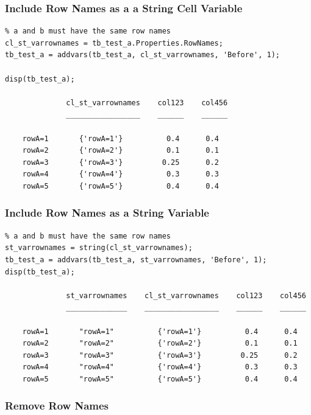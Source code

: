 \documentclass[
]{book}
\begin{document}
\hypertarget{include-row-names-as-a-a-string-cell-variable}{%
\subsubsection{Include Row Names as a a String Cell Variable}\label{include-row-names-as-a-a-string-cell-variable}}

\begin{verbatim}
% a and b must have the same row names
cl_st_varrownames = tb_test_a.Properties.RowNames;
tb_test_a = addvars(tb_test_a, cl_st_varrownames, 'Before', 1);

disp(tb_test_a);

              cl_st_varrownames    col123    col456
              _________________    ______    ______

    rowA=1       {'rowA=1'}          0.4      0.4  
    rowA=2       {'rowA=2'}          0.1      0.1  
    rowA=3       {'rowA=3'}         0.25      0.2  
    rowA=4       {'rowA=4'}          0.3      0.3  
    rowA=5       {'rowA=5'}          0.4      0.4  
\end{verbatim}

\hypertarget{include-row-names-as-a-string-variable}{%
\subsubsection{Include Row Names as a String Variable}\label{include-row-names-as-a-string-variable}}

\begin{verbatim}
% a and b must have the same row names
st_varrownames = string(cl_st_varrownames);
tb_test_a = addvars(tb_test_a, st_varrownames, 'Before', 1);
disp(tb_test_a);

              st_varrownames    cl_st_varrownames    col123    col456
              ______________    _________________    ______    ______

    rowA=1       "rowA=1"          {'rowA=1'}          0.4      0.4  
    rowA=2       "rowA=2"          {'rowA=2'}          0.1      0.1  
    rowA=3       "rowA=3"          {'rowA=3'}         0.25      0.2  
    rowA=4       "rowA=4"          {'rowA=4'}          0.3      0.3  
    rowA=5       "rowA=5"          {'rowA=5'}          0.4      0.4  
\end{verbatim}

\hypertarget{remove-row-names}{%
\subsubsection{Remove Row Names}\label{remove-row-names}}
\end{document}
